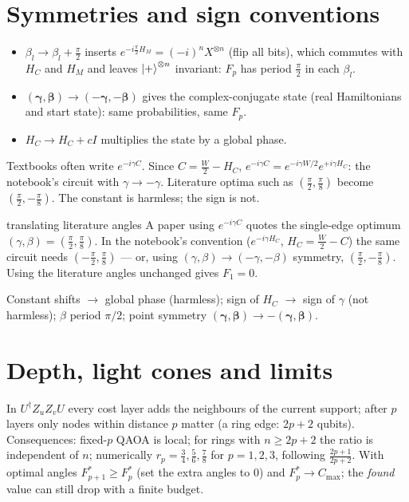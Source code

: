 \documentclass[11pt,a4paper,openany]{book}
\newcounter{wex}[chapter]
\newcommand{\bg}{\boldsymbol\gamma}
\newcommand{\bb}{\boldsymbol\beta}
\begin{document}
\section{Symmetries and sign conventions}
\begin{itemize}
\item $\beta_l \to \beta_l + \frac\pi2$ inserts $e^{-i\frac\pi2H_M} = (-i)^nX^{\otimes n}$ (flip all bits), which commutes with $H_C$ and $H_M$ and leaves
$\ket+^{\otimes n}$ invariant: $F_p$ has period $\frac\pi2$ in each $\beta_l$.
\item $(\bg, \bb) \to (-\bg, -\bb)$ gives the complex-conjugate state (real Hamiltonians and start state): same probabilities, same $F_p$.
\item $H_C \to H_C + cI$ multiplies the state by a global phase.
\end{itemize}
\begin{trap}
Textbooks often write $e^{-i\gamma C}$. Since $C = \frac W2 - H_C$, $e^{-i\gamma C} = e^{-i\gamma W/2}e^{+i\gamma H_C}$: the notebook's circuit with
$\gamma \to -\gamma$. Literature optima such as $(\frac\pi2, \frac\pi8)$ become $(\frac\pi2, -\frac\pi8)$. The constant is harmless; the sign is not.
\end{trap}

\begin{wexample}{translating literature angles}
A paper using $e^{-i\gamma C}$ quotes the single-edge optimum $(\gamma, \beta) = (\frac\pi2, \frac\pi8)$. In the notebook's convention ($e^{-i\gamma H_C}$, $H_C = \frac W2 - C$) the same
circuit needs $(-\frac\pi2, \frac\pi8)$ --- or, using $(\gamma, \beta) \to (-\gamma, -\beta)$ symmetry, $(\frac\pi2, -\frac\pi8)$. Using the literature angles unchanged gives $F_1 = 0$.
\end{wexample}
\begin{checklist}
Constant shifts $\to$ global phase (harmless); sign of $H_C$ $\to$ sign of $\gamma$ (not harmless); $\beta$ period $\pi/2$; point symmetry $(\bg, \bb) \to -(\bg, \bb)$.
\end{checklist}

\section{Depth, light cones and limits}
In $U^\dagger Z_uZ_vU$ every cost layer adds the neighbours of the current support; after $p$ layers only nodes within distance $p$
matter (a ring edge: $2p + 2$ qubits). Consequences: fixed-$p$ QAOA is local; for rings with $n \ge 2p + 2$ the ratio is independent of
$n$; numerically $r_p = \frac34, \frac56, \frac78$ for $p = 1, 2, 3$, following $\frac{2p+1}{2p+2}$. With optimal angles $F_{p+1}^* \ge F_p^*$
(set the extra angles to 0) and $F_p^* \to C_{\max}$; the \emph{found} value can still drop with a finite budget.
\end{document}
